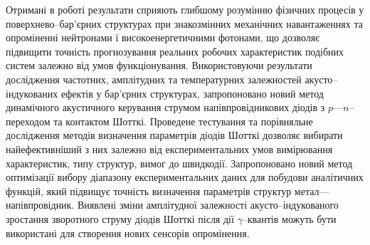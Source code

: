 {\influenceTXT}
Отримані в роботі результати сприяють глибшому розумінню фізичних процесів у поверхнево--бар'єрних структурах при  
знакозмінних механічних навантаженнях та опроміненні нейтронами і високоенергетичними фотонами, що
дозволяє підвищити точність прогнозування реальних робочих характеристик подібних систем залежно від умов функціонування.
Використовуючи результати дослідження частотних, амплітудних та температурних залежностей акусто--індукованих ефектів у бар'єрних структурах,
запропоновано новий метод динамічного акустичного керування струмом напівпровідникових діодів з $p$---$n$--переходом та контактом Шотткі.
Проведене тестування та порівняльне дослідження методів визначення параметрів діодів Шотткі дозволяє вибирати найефективніший з них залежно
від експериментальних умов вимірювання характеристик, типу структур, вимог до швидкодії.
Запропоновано новий метод оптимізації вибору діапазону експериментальних даних для побудови аналітичних функцій, який підвищує точність визначення параметрів структур метал---напівпровідник.
Виявлені зміни амплітудної залежності акусто--індукованого зростання зворотного струму  діодів Шотткі
 після дії $\gamma$--квантів
можуть бути використані для створення нових сенсорів опромінення.




